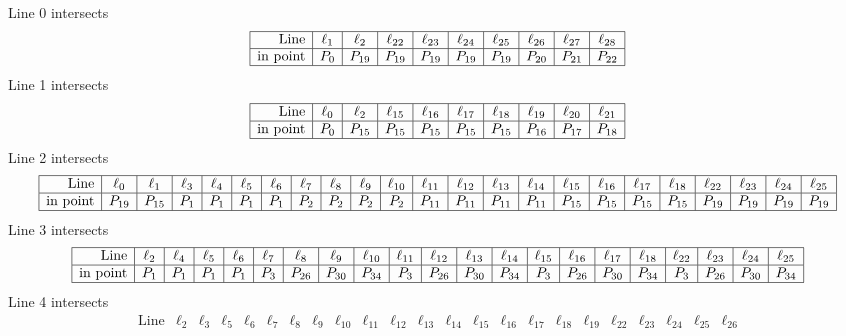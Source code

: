 \documentclass{article}
\begin{document}
{Line 0 intersects 
$$
\begin{array}{|r*{9}{|c}|}
\hline
\mbox{Line}  & \ell_{1} & \ell_{2} & \ell_{22} & \ell_{23} & \ell_{24} & \ell_{25} & \ell_{26} & \ell_{27} & \ell_{28}\\
\hline
\mbox{in point}  & P_{0} & P_{19} & P_{19} & P_{19} & P_{19} & P_{19} & P_{20} & P_{21} & P_{22}\\
\hline
\end{array}
$$
Line 1 intersects 
$$
\begin{array}{|r*{9}{|c}|}
\hline
\mbox{Line}  & \ell_{0} & \ell_{2} & \ell_{15} & \ell_{16} & \ell_{17} & \ell_{18} & \ell_{19} & \ell_{20} & \ell_{21}\\
\hline
\mbox{in point}  & P_{0} & P_{15} & P_{15} & P_{15} & P_{15} & P_{15} & P_{16} & P_{17} & P_{18}\\
\hline
\end{array}
$$
Line 2 intersects 
$$
\begin{array}{|r*{22}{|c}|}
\hline
\mbox{Line}  & \ell_{0} & \ell_{1} & \ell_{3} & \ell_{4} & \ell_{5} & \ell_{6} & \ell_{7} & \ell_{8} & \ell_{9} & \ell_{10} & \ell_{11} & \ell_{12} & \ell_{13} & \ell_{14} & \ell_{15} & \ell_{16} & \ell_{17} & \ell_{18} & \ell_{22} & \ell_{23} & \ell_{24} & \ell_{25}\\
\hline
\mbox{in point}  & P_{19} & P_{15} & P_{1} & P_{1} & P_{1} & P_{1} & P_{2} & P_{2} & P_{2} & P_{2} & P_{11} & P_{11} & P_{11} & P_{11} & P_{15} & P_{15} & P_{15} & P_{15} & P_{19} & P_{19} & P_{19} & P_{19}\\
\hline
\end{array}
$$
Line 3 intersects 
$$
\begin{array}{|r*{20}{|c}|}
\hline
\mbox{Line}  & \ell_{2} & \ell_{4} & \ell_{5} & \ell_{6} & \ell_{7} & \ell_{8} & \ell_{9} & \ell_{10} & \ell_{11} & \ell_{12} & \ell_{13} & \ell_{14} & \ell_{15} & \ell_{16} & \ell_{17} & \ell_{18} & \ell_{22} & \ell_{23} & \ell_{24} & \ell_{25}\\
\hline
\mbox{in point}  & P_{1} & P_{1} & P_{1} & P_{1} & P_{3} & P_{26} & P_{30} & P_{34} & P_{3} & P_{26} & P_{30} & P_{34} & P_{3} & P_{26} & P_{30} & P_{34} & P_{3} & P_{26} & P_{30} & P_{34}\\
\hline
\end{array}
$$
Line 4 intersects 
$$
\begin{array}{|r*{22}{|c}|}
\hline
\mbox{Line}  & \ell_{2} & \ell_{3} & \ell_{5} & \ell_{6} & \ell_{7} & \ell_{8} & \ell_{9} & \ell_{10} & \ell_{11} & \ell_{12} & \ell_{13} & \ell_{14} & \ell_{15} & \ell_{16} & \ell_{17} & \ell_{18} & \ell_{19} & \ell_{22} & \ell_{23} & \ell_{24} & \ell_{25} & \ell_{26}\\

\end{array}$$}
\end{document}
